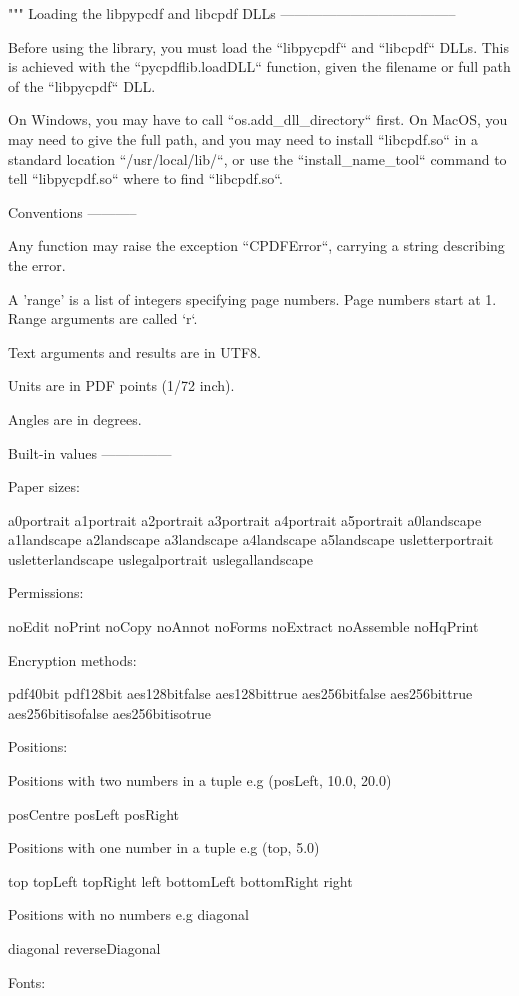 """
Loading the libpypcdf and libcpdf DLLs
--------------------------------------

Before using the library, you must load the ``libpycpdf`` and ``libcpdf`` DLLs.
This is achieved with the ``pycpdflib.loadDLL`` function, given the filename or
full path of the ``libpycpdf`` DLL.

On Windows, you may have to call ``os.add_dll_directory`` first. On MacOS, you
may need to give the full path, and you may need to install ``libcpdf.so`` in a
standard location ``/usr/local/lib/``, or use the ``install_name_tool`` command
to tell ``libpycpdf.so`` where to find ``libcpdf.so``.

Conventions
-----------

Any function may raise the exception ``CPDFError``, carrying a string
describing the error.

A 'range' is a list of integers specifying page numbers. Page numbers start at
1. Range arguments are called `r`.

Text arguments and results are in UTF8.

Units are in PDF points (1/72 inch).

Angles are in degrees.


Built-in values
---------------

Paper sizes:

a0portrait a1portrait a2portrait a3portrait a4portrait a5portrait a0landscape
a1landscape a2landscape a3landscape a4landscape a5landscape usletterportrait
usletterlandscape uslegalportrait uslegallandscape

Permissions:

noEdit noPrint noCopy noAnnot noForms noExtract noAssemble noHqPrint

Encryption methods:

pdf40bit pdf128bit aes128bitfalse aes128bittrue aes256bitfalse aes256bittrue
aes256bitisofalse aes256bitisotrue

Positions:

Positions with two numbers in a tuple e.g (posLeft, 10.0, 20.0)

posCentre posLeft posRight

Positions with one number in a tuple e.g (top, 5.0)

top topLeft topRight left bottomLeft bottomRight right

Positions with no numbers e.g diagonal

diagonal reverseDiagonal

Fonts:

